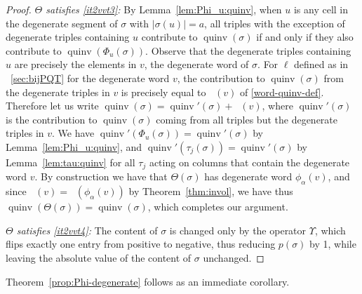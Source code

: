 \documentclass[11pt]{article}
\theoremstyle{definition}
\numberwithin{equation}{section}
\DeclareMathOperator{\quinvL}{\quinv^{(\ell)}}
\DeclareMathOperator{\quinv}{quinv}
\begin{document}
\begin{proof}
\emph{$\Theta$ satisfies \ref{it2vvt3}:} By Lemma~\ref{lem:Phi_u:quinv}, when $u$ is any cell in the degenerate segment of $\sigma$ with $|\sigma(u)|=a$, all triples with the exception of degenerate triples containing $u$ contribute to $\quinv(\sigma)$ if and only if they also contribute to $\quinv(\Phi_u(\sigma))$. Observe that the degenerate triples containing $u$ are precisely the elements in $v$, the degenerate word of $\sigma$. For $\ell$ defined as in ~\ref{sec:bijPQT} for the degenerate word $v$,  the contribution to $\quinv(\sigma)$ from the degenerate triples in $v$ is precisely equal to $\quinvL(v)$ of \eqref{word-quinv-def}. Therefore let us write $\quinv(\sigma)=\quinv'(\sigma)+\quinvL(v)$, where $\quinv'(\sigma)$ is the contribution to $\quinv(\sigma)$ coming from all triples but the degenerate triples in $v$. We have $\quinv'(\Phi_u(\sigma))=\quinv'(\sigma)$ by Lemma~\ref{lem:Phi_u:quinv}, and $\quinv'(\tau_j(\sigma))=\quinv'(\sigma)$ by Lemma~\ref{lem:tau:quinv} for all $\tau_j$ acting on columns that contain the degenerate word $v$. By construction we have that $\Theta(\sigma)$ has degenerate word $\phi_\alpha(v)$, and since $\quinvL(v)=\quinvL(\phi_\alpha(v))$ by Theorem~\ref{thm:invol}, we have thus $\quinv(\Theta(\sigma))=\quinv(\sigma)$, which completes our argument.

\emph{$\Theta$ satisfies \ref{it2vvt4}:} The content of $\sigma$ is changed only by the operator $\Upsilon$, which flips exactly one entry from positive to negative, thus reducing $p(\sigma)$ by 1, while leaving the absolute value of the content of $\sigma$ unchanged.
\end{proof}
Theorem~\ref{prop:Phi-degenerate} follows as an immediate corollary.
\end{document}
